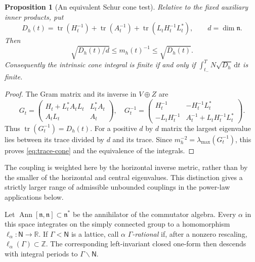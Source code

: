 \documentclass[10pt,a4paper]{article}
\numberwithin{equation}{section}
\newtheorem{proposition}[theorem]{Proposition}
\theoremstyle{definition}
\theoremstyle{remark}
\newcommand{\R}{\mathbb R}
\newcommand{\dd}{\mathrm d}
\begin{document}
\begin{proposition}[An equivalent Schur cone test]
\label{prop:trace-cone}
Relative to the fixed auxiliary inner products, put
\[
 D_h(t)=\operatorname{tr}(H_t^{-1})+
 \operatorname{tr}(A_t^{-1})+
 \operatorname{tr}(L_tH_t^{-1}L_t^*),\qquad d=\dim\mathfrak n.
\]
Then
\begin{equation}
 \sqrt{D_h(t)/d}\le m_h(t)^{-1}\le\sqrt{D_h(t)}.
 \label{eq:trace-cone}
\end{equation}
Consequently the intrinsic cone integral is finite if and only if
$\int_{t_-}^T N\sqrt{D_h}\,\dd t$ is finite.
\end{proposition}

\begin{proof}
The Gram matrix and its inverse in $V\oplus Z$ are
\[
 G_t=\begin{pmatrix}H_t+L_t^*A_tL_t&L_t^*A_t\\A_tL_t&A_t\end{pmatrix},
 \quad
 G_t^{-1}=\begin{pmatrix}
 H_t^{-1}&-H_t^{-1}L_t^*\\
 -L_tH_t^{-1}&A_t^{-1}+L_tH_t^{-1}L_t^*
 \end{pmatrix}.
\]
Thus $\operatorname{tr}(G_t^{-1})=D_h(t)$.  For a positive $d$ by $d$
matrix the largest eigenvalue lies between its trace divided by $d$ and
its trace.  Since $m_h^{-2}=\lambda_{\max}(G_t^{-1})$, this proves
\eqref{eq:trace-cone} and the equivalence of the integrals.
\end{proof}

The coupling is weighted here by the horizontal inverse metric, rather
than by the smaller of the horizontal and central eigenvalues.  This
distinction gives a strictly larger range of admissible unbounded
couplings in the power-law applications below.

Let
$\operatorname{Ann}[\mathfrak n,\mathfrak n]\subset\mathfrak n^*$ be the
annihilator of the commutator algebra.  Every
$\alpha$ in this space integrates on the simply connected group to a
homomorphism $\ell_\alpha:\mathsf N\to\R$.  If $\Gamma<\mathsf N$ is a
lattice, call $\alpha$ \emph{$\Gamma$-rational} if, after a nonzero
rescaling, $\ell_\alpha(\Gamma)\subset\mathbb Z$.  The corresponding
left-invariant closed one-form then descends with integral periods to
$\Gamma\backslash\mathsf N$.
\end{document}

